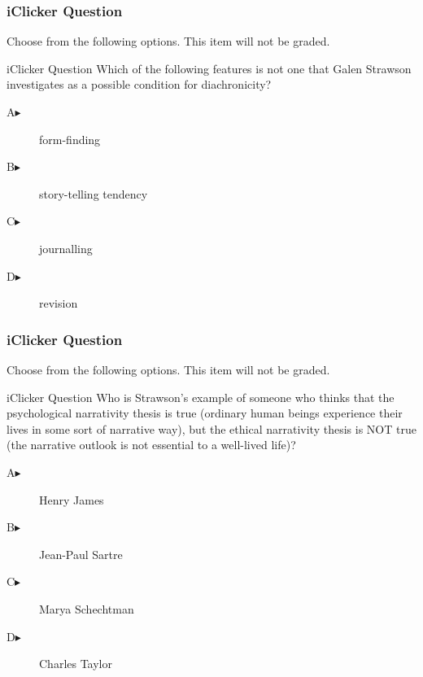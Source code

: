 \documentclass[xcolor=dvipsnames]{beamer}
\begin{document}
\begin{frame}
  \frametitle{iClicker Question}
Choose from the following options. This item will not be graded.
\begin{block}{iClicker Question}
Which of the following features is not one that Galen Strawson
investigates as a possible condition for diachronicity?
\end{block}
\begin{description}
\item[A\hspace{.2in}$\blacktriangleright$] form-finding
\item[B\hspace{.2in}$\blacktriangleright$] story-telling tendency
\item[C\hspace{.2in}$\blacktriangleright$] journalling
\item[D\hspace{.2in}$\blacktriangleright$] revision
\end{description}
\end{frame}

\begin{frame}
  \frametitle{iClicker Question}
Choose from the following options. This item will not be graded.
\begin{block}{iClicker Question}
Who is Strawson's example of someone who thinks that the psychological
narrativity thesis is true (ordinary human beings experience their
lives in some sort of narrative way), but the ethical narrativity
thesis is NOT true (the narrative outlook is not essential to a
well-lived life)?
\end{block}
\begin{description}
\item[A\hspace{.2in}$\blacktriangleright$] Henry James
\item[B\hspace{.2in}$\blacktriangleright$] Jean-Paul Sartre
\item[C\hspace{.2in}$\blacktriangleright$] Marya Schechtman
\item[D\hspace{.2in}$\blacktriangleright$] Charles Taylor
\end{description}
\end{frame}
\end{document}
